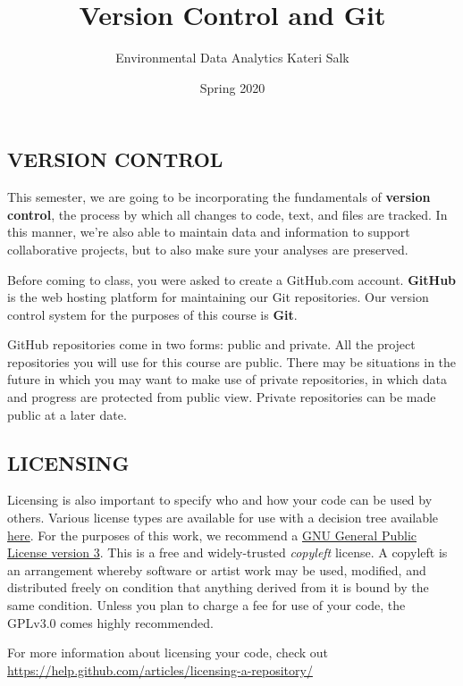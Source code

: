 \documentclass[
]{article}
\title{Version Control and Git}
\author{Environmental Data Analytics \textbar{} Kateri Salk}
\date{Spring 2020}
\begin{document}
\maketitle

\hypertarget{version-control}{%
\subsection{VERSION CONTROL}\label{version-control}}

This semester, we are going to be incorporating the fundamentals of
\textbf{version control}, the process by which all changes to code,
text, and files are tracked. In this manner, we're also able to maintain
data and information to support collaborative projects, but to also make
sure your analyses are preserved.

Before coming to class, you were asked to create a GitHub.com account.
\textbf{GitHub} is the web hosting platform for maintaining our Git
repositories. Our version control system for the purposes of this course
is \textbf{Git}.

GitHub repositories come in two forms: public and private. All the
project repositories you will use for this course are public. There may
be situations in the future in which you may want to make use of private
repositories, in which data and progress are protected from public view.
Private repositories can be made public at a later date.

\hypertarget{licensing}{%
\subsection{LICENSING}\label{licensing}}

Licensing is also important to specify who and how your code can be used
by others. Various license types are available for use with a decision
tree available \href{https://choosealicense.com/}{here}. For the
purposes of this work, we recommend a
\href{https://choosealicense.com/licenses/gpl-3.0/}{GNU General Public
License version 3}. This is a free and widely-trusted \emph{copyleft}
license. A copyleft is an arrangement whereby software or artist work
may be used, modified, and distributed freely on condition that anything
derived from it is bound by the same condition. Unless you plan to
charge a fee for use of your code, the GPLv3.0 comes highly recommended.

For more information about licensing your code, check out
\url{https://help.github.com/articles/licensing-a-repository/}
\end{document}
